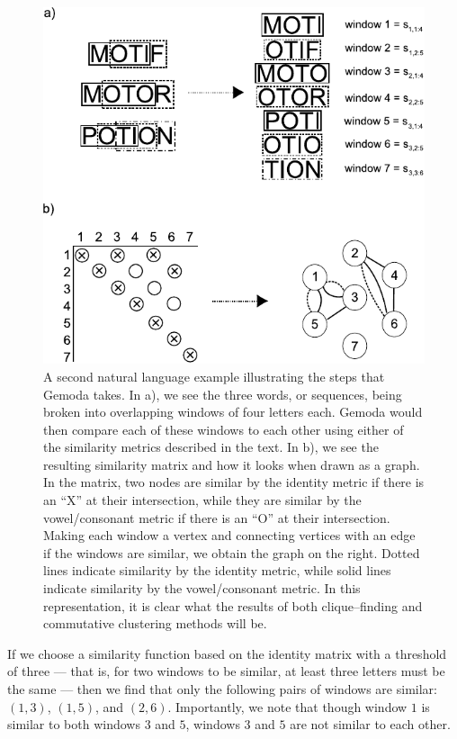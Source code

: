     \begin{figure}[p!]
        \centering
        \includegraphics[width=\textwidth]{Body/Images-chap3/naturalexample.pdf}
        \caption[A second natural language example]{A second natural language example illustrating the
            steps that Gemoda takes.  In a), we see the three words,
        or sequences, being broken into overlapping windows of
        four letters each.  Gemoda would then compare each of these
        windows to each other using either of the similarity metrics
        described in the text.  In b), we see the resulting
        similarity matrix and how it looks when drawn as a graph.
        In the matrix, two nodes are similar by the identity metric
        if there is an ``X'' at their intersection, while they
        are similar by the vowel/consonant metric if there is
        an ``O'' at their intersection.  Making each window a vertex
        and connecting vertices with an edge if the windows are
        similar, we obtain the graph on the right.  Dotted lines
        indicate similarity by the identity metric, while solid
        lines indicate similarity by the vowel/consonant metric.  In
        this representation, it is clear what the results of both
        clique--finding and commutative clustering methods will be.
        }\label{fig:natural}
    \end{figure}

    If we choose a similarity function based on the identity
    matrix with a threshold of three --- that is, for two windows
    to be similar, at least three letters must be the same ---
    then we find that only the following pairs of windows are similar:
    $(1, 3)$, $(1, 5)$, and $(2, 6)$.  Importantly, we note that though
    window $1$ is similar to both windows $3$ and $5$, windows $3$ and
    $5$ are not similar to each other.

